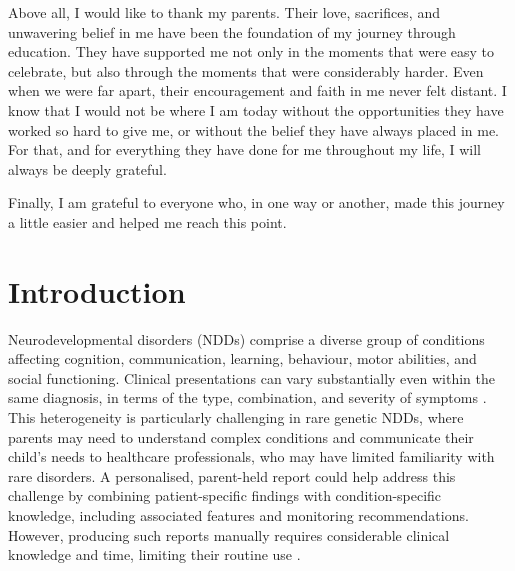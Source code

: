 \documentclass[ %
                    author={Aman Kumar Singh},
                supervisor={Dr. Edwin Simpson},
                    degree={MSc},
                     title={Quality-Aware Knowledge Distillation of Large Language Models for Efficient Personalised Clinical Report Generation},
                  subtitle={},
                      type={},
                      year={2021}]{dissertation}
\begin{document}
Above all, I would like to thank my parents. Their love, sacrifices, and unwavering belief in me have been the foundation of my journey through education. They have supported me not only in the moments that were easy to celebrate, but also through the moments that were considerably harder. Even when we were far apart, their encouragement and faith in me never felt distant. I know that I would not be where I am today without the opportunities they have worked so hard to give me, or without the belief they have always placed in me. For that, and for everything they have done for me throughout my life, I will always be deeply grateful.

Finally, I am grateful to everyone who, in one way or another, made this journey a little easier and helped me reach this point.


%

\mainmatter

\chapter{Introduction}
\label{chap:introduction}
Neurodevelopmental disorders (NDDs) comprise a diverse group of conditions
affecting cognition, communication, learning, behaviour, motor abilities, and
social functioning. Clinical presentations can vary substantially even within
the same diagnosis, in terms of the type, combination, and severity of symptoms
\cite{gao_genetic_2025,assadourian_precision_2025}. This heterogeneity is
particularly challenging in rare genetic NDDs, where parents may need to
understand complex conditions and communicate their child's needs to healthcare
professionals, who may have limited familiarity with rare disorders. A
personalised, parent-held report could help address this challenge by combining
patient-specific findings with condition-specific knowledge, including
associated features and monitoring recommendations. However, producing such
reports manually requires considerable clinical knowledge and time, limiting
their routine use \cite{patel_descriptive_2023, carter_qualitative_2025, low_identifying_2025}.
\end{document}
